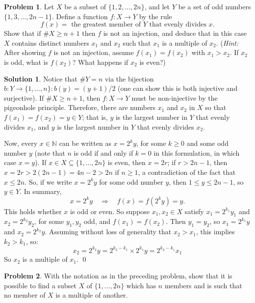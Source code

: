 \documentclass{article}
\numberwithin{equation}{section}
\theoremstyle{plain}
\theoremstyle{definition}
\newtheorem{problem}{Problem}
\newtheorem*{solution*}{Solution}
\newcommand{\N}{\mathbb N}
\begin{document}
\begin{problem}
	Let $X$ be a subset of $\{1, 2, \ldots, 2n\}$, and let $Y$ be a set of odd numbers $\{1, 3, \ldots, 2n-1\}$. Define a function $f : X \to Y$ by the rule 
	\[
	f(x) = \textrm{ the greatest member of $Y$ that evenly divides $x$}.
	\]
	Show that if $\#X \geq n+1$ then $f$ is not an injection, and deduce that in this case $X$ contains distinct numbers $x_1$ and $x_2$ such that $x_1$ is a multiple of $x_2$. (\emph{Hint:} After showing $f$ is not an injection, assume $f(x_1) = f(x_2)$ with $x_1 > x_2$. If $x_2$ is odd, what is $f(x_2)$? What happens if $x_2$ is even?)
\end{problem}

\begin{solution*}
	Notice that $\#Y = n$ via the bijection $b : Y \to \{1, \ldots, n\} : b(y) = (y+1)/2$ (one can show this is both injective and surjective). If $\#X \geq n+1$, then $f : X \to Y$ must be non-injective by the pigeonhole principle. Therefore, there are numbers $x_1$ and $x_2$ in $X$ so that $f(x_1) = f(x_2) = y \in Y$; that is, $y$ is the largest number in $Y$ that evenly divides $x_1$, and $y$ is the largest number in $Y$ that evenly divides $x_2$. 
	
	Now, every $x \in \N$ can be written as $x = 2^k y$, for some $k \geq 0$ and some odd number $y$ (note that $n$ is odd if and only if $k=0$ in this formulation, in which case $x=y$). If $x \in X \subseteq \{1, \ldots, 2n\}$ is even, then $x = 2r$; if $r > 2n-1$, then $x = 2r > 2(2n-1) = 4n-2 > 2n$ if $n \geq 1$, a contradiction of the fact that $x \leq 2n$. So, if we write $x = 2^k y$ for some odd number $y$, then $1 \leq y \leq 2n-1$, so $y \in Y$. In summary, 
	\[
	x = 2^k y \quad \Rightarrow \quad f(x) = f(2^k y) = y.
	\]
	This holds whether $x$ is odd or even. So suppose $x_1, x_2 \in X$ satisfy $x_1 = 2^{k_1} y_1$ and $x_2 = 2^{k_2} y_2$, for some $y_1, y_2$ odd, and $f(x_1) = f(x_2)$. Then $y_1 = y_2$, so $x_1 = 2^{k_1} y$ and $x_2 = 2^{k_2}y$. Assuming without loss of generality that $x_2 > x_1$, this implies $k_2 > k_1$, so: $$x_2 = 2^{k_2} y = 2^{k_2-k_1} \times 2^{k_1} y = 2^{k_2 - k_1}x_1$$ So $x_2$ is a multiple of $x_1$. \qed
\end{solution*}

\begin{problem}
	With the notation as in the preceding problem, show that it is possible to find a subset $X$ of $\{1, \ldots, 2n\}$ which has $n$ members and is such that no member of $X$ is a multiple of another. 
\end{problem}
\end{document}
